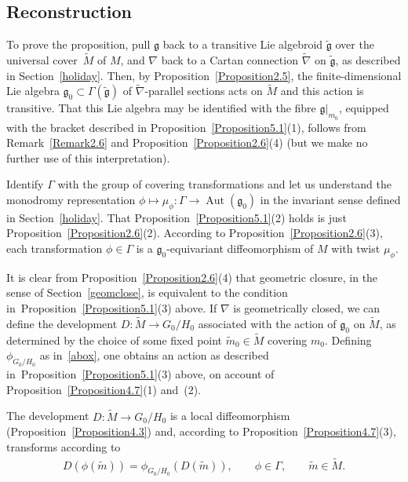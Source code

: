\documentclass[pdftex]{sigma}
\DeclareMathOperator{\automorphism}{Aut}
\numberwithin{equation}{section}
\begin{document}
\subsection{Reconstruction}\label{hutty}

To prove the proposition, pull ${\mathfrak g} $ back to a transitive
Lie algebroid $\tilde {\mathfrak g} $ over the universal cover~$\tilde
M$ of $M$, and $\nabla $ back to a Cartan connection $\tilde \nabla $
on $\tilde {\mathfrak g}$, as described in Section~\ref{holiday}. Then, by
Proposition~\ref{Proposition2.5}, the f\/inite-dimensional Lie algebra
${\mathfrak g}_0 \subset \Gamma(\tilde {\mathfrak g})$ of $\tilde
\nabla $-parallel sections acts on $\tilde M$ and this action is
transitive. That this Lie algebra may be identif\/ied with the f\/ibre
${\mathfrak g}|_{m_0}$, equipped with the bracket described in Proposition~\ref{Proposition5.1}(1),
follows from Remark~\ref{Remark2.6} and Proposition~\ref{Proposition2.6}(4)
(but we make no further use of this
interpretation).

Identify $\Gamma$ with the group of covering transformations and let
us understand the monodromy representation $\phi \mapsto \mu_\phi
\colon \Gamma \rightarrow \automorphism ({\mathfrak g}_0)$ in the
invariant sense def\/ined in Section~\ref{holiday}. That Proposition~\ref{Proposition5.1}(2) %
holds is
just Proposition~\ref{Proposition2.6}(2).
According to Proposition~\ref{Proposition2.6}(3),
each transformation $\phi \in \Gamma $ is a
${\mathfrak g}_0$-equivariant dif\/feomorphism of $M$ with twist
$\mu_\phi$.

It is clear from Proposition~\ref{Proposition2.6}(4)
that geometric
closure, in the sense of Section~\ref{geomclose}, is equivalent to the
condition in~Proposition~\ref{Proposition5.1}(3) %
above. If $\nabla $ is geometrically closed,
we can def\/ine the development $D \colon \tilde M \rightarrow
{G_0/H_0}$ associated with the action of ${\mathfrak g}_0$ on $\tilde
M$, as determined by the choice of some f\/ixed point $\tilde m_0 \in
\tilde M$ covering $m_0$. Def\/ining $\phi_{G_0/H_0} $ as in~\eqref{abox},
 one obtains an action as described in~Proposition~\ref{Proposition5.1}(3) %
above, on account of Proposition~\ref{Proposition4.7}(1) and~(2).  %

The development $D \colon \tilde M \rightarrow {G_0/H_0} $ is a local
dif\/feomorphism (Proposition~\ref{Proposition4.3}) %
and, according to
Proposition~\ref{Proposition4.7}(3), %
transforms according to
\begin{gather}
  D(\phi(\tilde m))=\phi_{G_0/H_0} (D(\tilde m)),
  \qquad \phi \in \Gamma,\qquad \tilde m \in \tilde M.  \label{cvg}
\end{gather}
\end{document}
